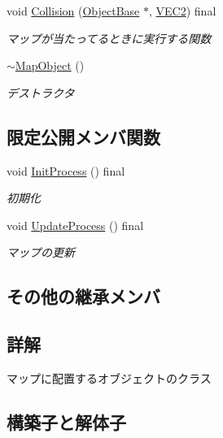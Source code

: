 \begin{DoxyCompactItemize}
void \mbox{\hyperlink{class_map_object_a61c2b7e046b76d98adbf23c9e6302918}{Collision}} (\mbox{\hyperlink{class_object_base}{Object\+Base}} $\ast$, \mbox{\hyperlink{common_8h_afb0c5e21d4133ff4f200992c0b534e1b}{V\+E\+C2}}) final
\begin{DoxyCompactList}\small\item\em マップが当たってるときに実行する関数 \end{DoxyCompactList}\item 
\mbox{\hyperlink{class_map_object_aa601344267a49df197e841fcbd732209}{$\sim$\+Map\+Object}} ()
\begin{DoxyCompactList}\small\item\em デストラクタ \end{DoxyCompactList}\end{DoxyCompactItemize}
\subsection*{限定公開メンバ関数}
\begin{DoxyCompactItemize}
\item 
void \mbox{\hyperlink{class_map_object_a3043cddb8aaad0eab27a076e9bee0284}{Init\+Process}} () final
\begin{DoxyCompactList}\small\item\em 初期化 \end{DoxyCompactList}\item 
void \mbox{\hyperlink{class_map_object_ab6b8849f15175417eca94b2703945e4b}{Update\+Process}} () final
\begin{DoxyCompactList}\small\item\em マップの更新 \end{DoxyCompactList}\end{DoxyCompactItemize}
\subsection*{その他の継承メンバ}


\subsection{詳解}
マップに配置するオブジェクトのクラス 

\subsection{構築子と解体子}
\mbox{\label{class_map_object_a568754515cc72ce0861d30c3040d26d2}} 
